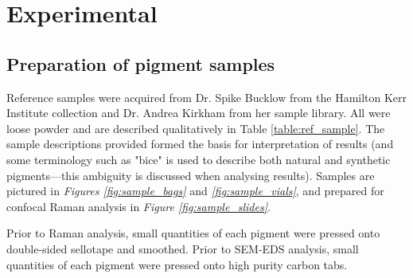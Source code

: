 
\chapter{Experimental} %

\ifpdf
    \graphicspath{{Chapter2/Figs/Raster/}{Chapter2/Figs/PDF/}{Chapter2/Figs/}}
\else
    \graphicspath{{Chapter2/Figs/Vector/}{Chapter2/Figs/}}
\fi


\section[Preparation of samples]{Preparation of pigment samples} 
\label{section2.1}

Reference samples were acquired from Dr. Spike Bucklow from the Hamilton Kerr Institute collection and Dr. Andrea Kirkham from her sample library. All were loose powder and are described qualitatively in Table \ref{table:ref_sample}. The sample descriptions provided formed the basis for interpretation of results (and some terminology such as "bice" is used to describe both natural and synthetic pigments---this ambiguity is discussed when analysing results). Samples are pictured in \textit{Figures \ref{fig:sample_bags}} and \textit{\ref{fig:sample_vials}}, and prepared for confocal Raman analysis in \textit{Figure \ref{fig:sample_slides}}.

Prior to Raman analysis, small quantities of each pigment were pressed onto double-sided sellotape and smoothed. Prior to SEM-EDS analysis, small quantities of each pigment were pressed onto high purity carbon tabs.

